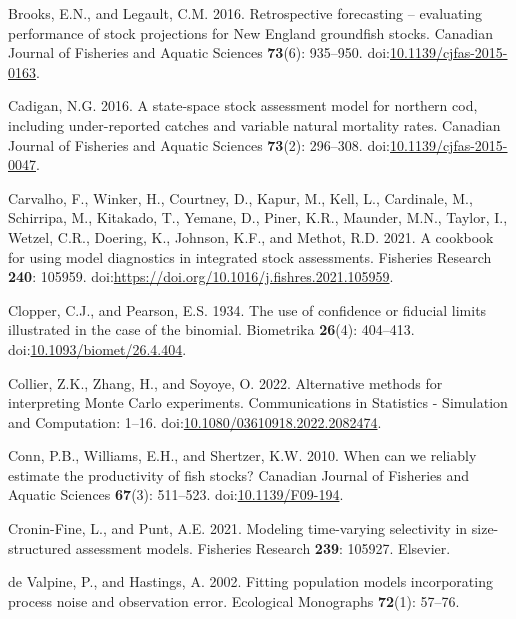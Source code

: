 \documentclass[
  12pt,
]{article}
\newlength{\cslhangindent}
\newenvironment{CSLReferences}[2] %
 {\begin{list}{}{%
  \setlength{\itemindent}{0pt}
  \setlength{\leftmargin}{0pt}
  \setlength{\parsep}{0pt}
  \ifodd #1
   \setlength{\leftmargin}{\cslhangindent}
   \setlength{\itemindent}{-1\cslhangindent}
  \fi
  \setlength{\itemsep}{#2\baselineskip}}}
 {\end{list}}
\begin{document}
\begin{CSLReferences}{1}{0}
Brooks, E.N., and Legault, C.M. 2016. Retrospective forecasting --
evaluating performance of stock projections for {N}ew {E}ngland
groundfish stocks. Canadian Journal of Fisheries and Aquatic Sciences
\textbf{73}(6): 935--950.
doi:\href{https://doi.org/10.1139/cjfas-2015-0163}{10.1139/cjfas-2015-0163}.

Cadigan, N.G. 2016. A state-space stock assessment model for northern
cod, including under-reported catches and variable natural mortality
rates. Canadian Journal of Fisheries and Aquatic Sciences
\textbf{73}(2): 296--308.
doi:\href{https://doi.org/10.1139/cjfas-2015-0047}{10.1139/cjfas-2015-0047}.

Carvalho, F., Winker, H., Courtney, D., Kapur, M., Kell, L., Cardinale,
M., Schirripa, M., Kitakado, T., Yemane, D., Piner, K.R., Maunder, M.N.,
Taylor, I., Wetzel, C.R., Doering, K., Johnson, K.F., and Methot, R.D.
2021. A cookbook for using model diagnostics in integrated stock
assessments. Fisheries Research \textbf{240}: 105959.
doi:\url{https://doi.org/10.1016/j.fishres.2021.105959}.

Clopper, C.J., and Pearson, E.S. 1934. The use of confidence or fiducial
limits illustrated in the case of the binomial. Biometrika
\textbf{26}(4): 404--413.
doi:\href{https://doi.org/10.1093/biomet/26.4.404}{10.1093/biomet/26.4.404}.

Collier, Z.K., Zhang, H., and Soyoye, O. 2022. Alternative methods for
interpreting {M}onte {C}arlo experiments. Communications in Statistics -
Simulation and Computation: 1--16.
doi:\href{https://doi.org/10.1080/03610918.2022.2082474}{10.1080/03610918.2022.2082474}.

Conn, P.B., Williams, E.H., and Shertzer, K.W. 2010. When can we
reliably estimate the productivity of fish stocks? Canadian Journal of
Fisheries and Aquatic Sciences \textbf{67}(3): 511--523.
doi:\href{https://doi.org/10.1139/F09-194}{10.1139/F09-194}.

Cronin-Fine, L., and Punt, A.E. 2021. Modeling time-varying selectivity
in size-structured assessment models. Fisheries Research \textbf{239}:
105927. Elsevier.

{de Valpine, P., and Hastings, A.} 2002. Fitting population models
incorporating process noise and observation error. Ecological Monographs
\textbf{72}(1): 57--76.


\end{CSLReferences}
\end{document}
